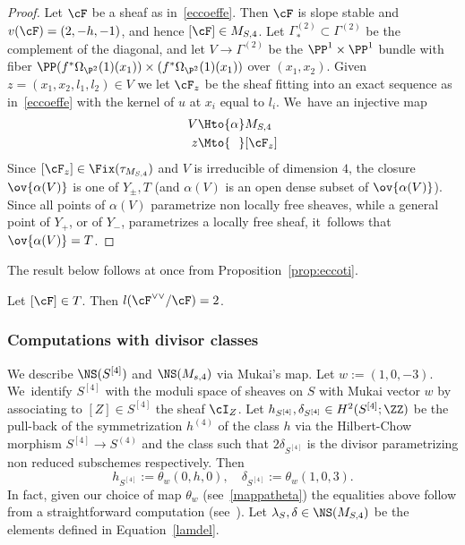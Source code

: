 \begin{proof}
Let $\cF$ be a sheaf as in~\eqref{eccoeffe}. Then $\cF$ is slope stable and $v(\cF)=(2,-h,-1)$, and hence $[\cF]\in M_{S,4}$. Let ${\mathsf\Gamma}^{(2)}_{*}\subset {\mathsf\Gamma}^{(2)}$ be the complement of the diagonal, and
let $V\to{\mathsf\Gamma}^{(2)}$ be the $\PP^1\times\PP^1$ bundle with fiber $\PP(f^*\Omega_{\P^2}(1)(x_1))\times(f^*\Omega_{\P^2}(1)(x_1))$ over $(x_1,x_2)$.
Given $z=(x_1,x_2,l_1,l_2)\in V$ we let $\cF_z$ be the sheaf fitting into an exact sequence as in~\eqref{eccoeffe} with the kernel of $u$ at $x_i$ equal to $l_i$. We~have an injective map
\begin{equation*}
\begin{aligned}
V & \Hto{\alpha} M_{S,4} \\
z & \Mto{\hphantom{\alpha}} [\cF_z]
\end{aligned}
\end{equation*}
Since $[\cF_z]\in\Fix(\tau_{M_{S,4}})$ and $V$ is irreducible of dimension $4$, the closure $\ov{\alpha(V)}$ is one of $Y_{\pm},T$ (and $\alpha(V)$ is an open dense subset of $\ov{\alpha(V)}$). Since all points of $\alpha(V)$ parametrize non locally free sheaves, while a general point of $Y_{+}$, or of $Y_{-}$, parametrizes a locally free sheaf, it~follows that $\ov{\alpha(V)}=T$.
\end{proof}

The result below follows at once from Proposition~\ref{prop:eccoti}.

\begin{coro}\label{coro:eccoti}
Let $[\cF]\in T$. Then $l(\cF^{\vee\vee}/\cF)=2$.
\end{coro}

\subsubsection*{Computations with divisor classes}
We describe $\NS(S^{[4]})$ and $\NS(M_{s,4})$ via Mukai's map.
Let $w:=(1,0,-3)$. We~identify $S^{[4]}$ with the moduli space of sheaves on $S$ with Mukai vector $w$ by associating to $[Z]\in S^{[4]}$ the sheaf $\cI_Z$.
Let $h_{S^{[4]}},\delta_{S^{[4]}}\in H^2(S^{[4]};\ZZ)$ be the pull-back of the symmetrization $h^{(4)}$ of the class $h$ via the
Hilbert-Chow morphism $S^{[4]}\to S^{(4)}$ and the class such that $2\delta_{S^{[4]}}$ is the divisor parametrizing non reduced subschemes respectively. Then
\begin{equation*}
h_{S^{[4]}}:=\theta_w(0,h,0),\quad \delta_{S^{[4]}}:=\theta_w(1,0,3).
\end{equation*}
In fact, given our choice of map $\theta_w$ (see~\ref{mappatheta}) the equalities above follow from a straightforward computation (see~\cite[p.\,630]{Kieran:weight2}).
Let $\lambda_S,\delta\in \NS(M_{S,4})$ be the elements defined in Equation~\eqref{lamdel}.

